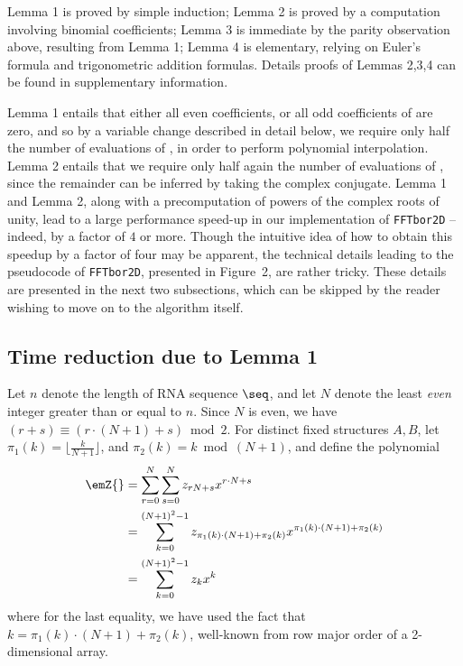 Lemma 1 is proved by simple induction; Lemma 2
is proved by a computation involving binomial coefficients;
Lemma 3 is immediate
by the parity observation above, resulting from Lemma 1;
Lemma 4 is elementary, relying on Euler's
formula and trigonometric addition formulas. Details proofs of
Lemmas 2,3,4 can be found in supplementary information.

Lemma 1 entails that either all even coefficients, or all odd coefficients
of \emZ{} are zero, and so by a variable change described in detail below,
we require only half the number of evaluations of \emZ{}, in order to perform
polynomial interpolation.
Lemma 2 entails that we require only half again the number of evaluations of
\emZ{}, since the remainder can be inferred by taking the complex conjugate.
Lemma 1 and Lemma 2, along with a
precomputation of powers of the complex roots of unity, lead to a
large performance speed-up in our implementation of {\tt FFTbor2D} -- indeed,
by a factor of $4$ or more. Though the intuitive idea of how to obtain
this speedup by a factor of four may be apparent, the technical details
leading to the pseudocode of {\tt FFTbor2D}, presented in
Figure~2, are rather tricky. These details
are presented in the next two subsections, which can be skipped by the
reader wishing to move on to the algorithm itself.
\medskip

\subsection{Time reduction due to Lemma 1}
Let $n$ denote the length of RNA sequence $\seq$, and let $N$ denote the
least {\em even} integer greater than or equal to $n$. Since $N$ is even,
we have $(r+s) \equiv (r\cdot(N+1)+s) \bmod 2$. For distinct
fixed structures $A,B$, let
$\pi_1(k) = \lfloor \frac{k}{N+1} \rfloor$, and
$\pi_2(k) = k \bmod (N+1)$, and define the polynomial
\begin{align}
\label{eqn:polynomialPeter}
\emZ{} &= \sum_{r=0}^{N} \sum_{s=0}^{N} z_{rN+s} x^{r\cdot N + s}\\
&=
\sum_{k=0}^{(N+1)^2-1} z_{\pi_1(k)\cdot (N+1) + \pi_2(k)}
x^{\pi_1(k)\cdot (N+1) + \pi_2(k)}\\
&=
\sum_{k=0}^{(N+1)^2-1} z_k x^k
\end{align}
where for the last equality, we have used the fact that
$k = \pi_1(k)\cdot (N+1) + \pi_2(k)$, well-known from
row major order of a 2-dimensional array.

